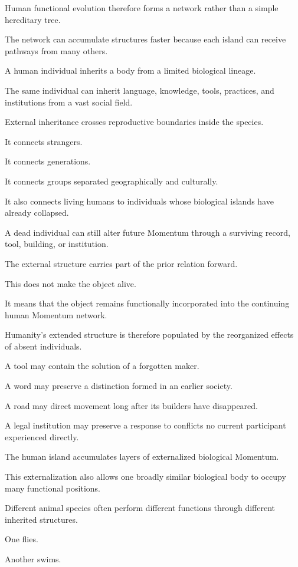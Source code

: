 Human functional evolution therefore forms a network rather than a simple hereditary tree.

The network can accumulate structures faster because each island can receive pathways from many others.

A human individual inherits a body from a limited biological lineage.

The same individual can inherit language, knowledge, tools, practices, and institutions from a vast social field.

External inheritance crosses reproductive boundaries inside the species.

It connects strangers.

It connects generations.

It connects groups separated geographically and culturally.

It also connects living humans to individuals whose biological islands have already collapsed.

A dead individual can still alter future Momentum through a surviving record, tool, building, or institution.

The external structure carries part of the prior relation forward.

This does not make the object alive.

It means that the object remains functionally incorporated into the continuing human Momentum network.

Humanity’s extended structure is therefore populated by the reorganized effects of absent individuals.

A tool may contain the solution of a forgotten maker.

A word may preserve a distinction formed in an earlier society.

A road may direct movement long after its builders have disappeared.

A legal institution may preserve a response to conflicts no current participant experienced directly.

The human island accumulates layers of externalized biological Momentum.

This externalization also allows one broadly similar biological body to occupy many functional positions.

Different animal species often perform different functions through different inherited structures.

One flies.

Another swims.

